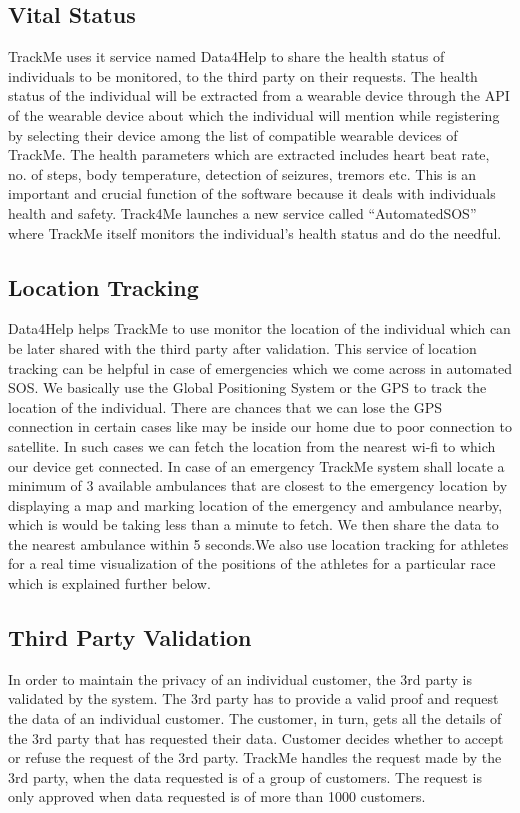 \subsection{Vital Status}
\qquad TrackMe uses it service named Data4Help to share the health status of individuals to be monitored, to the third party on their requests. The health status of the individual will be extracted from a wearable device through the API of the wearable device about which the individual will mention while registering by selecting their device among the list of compatible wearable devices of TrackMe. The health parameters which are extracted includes heart beat rate, no. of steps, body temperature, detection of seizures, tremors etc. This is an important and crucial function of the software because it deals with individuals health and safety. Track4Me launches a new service called “AutomatedSOS” where TrackMe itself monitors the individual's health status and do the needful.

\subsection{Location Tracking}
\qquad Data4Help helps TrackMe to use monitor the location of the individual which can be later shared with the third party after validation. This service of location tracking can be helpful in case of emergencies which we come across in automated SOS. We basically use the Global Positioning System or the GPS to track the location of the individual. There are chances that we can lose the GPS connection in certain cases like may be inside our home due to poor connection to satellite. In such cases we can fetch the location from the nearest wi-fi to which our device get connected. In case of an emergency TrackMe system shall locate a minimum of 3 available ambulances that are closest to the emergency location by displaying a map and marking location of the emergency and ambulance nearby, which is would be taking less than a minute to fetch. We then share the data to the nearest ambulance within 5 seconds.We also use location tracking for athletes for a real time visualization of the positions of the athletes for a particular race which is explained further below.

\subsection{Third Party Validation}
\qquad In order to maintain the privacy of an individual customer, the 3rd party is validated by the system. The 3rd party has to provide a valid proof and request the data of an individual customer. The customer, in turn, gets all the details of the 3rd party that has requested their data. Customer decides whether to accept or refuse the request of the 3rd party. TrackMe handles the request made by the 3rd party, when the data requested is of a group of customers. The request is only approved when data requested is of more than 1000 customers.

